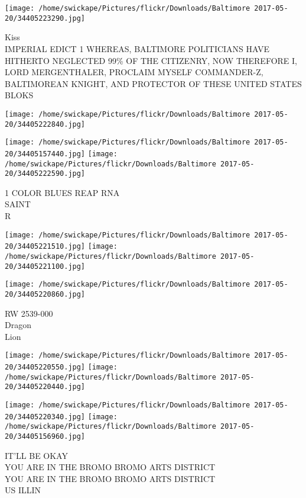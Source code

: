 \documentclass[10pt,letterpaper]{article}
\begin{document}
\vspace{0.25in}
\texttt{[image: /home/swickape/Pictures/flickr/Downloads/Baltimore 2017-05-20/34405223290.jpg]}

Kiss\\
IMPERIAL EDICT 1 WHEREAS, BALTIMORE POLITICIANS HAVE HITHERTO NEGLECTED 99\% OF THE CITIZENRY, NOW THEREFORE I, LORD MERGENTHALER, PROCLAIM MYSELF COMMANDER{-}Z, BALTIMOREAN KNIGHT, AND PROTECTOR OF THESE UNITED STATES\\
BLOKS
\pagebreak

\texttt{[image: /home/swickape/Pictures/flickr/Downloads/Baltimore 2017-05-20/34405222840.jpg]}

\vspace{0.25in}
\texttt{[image: /home/swickape/Pictures/flickr/Downloads/Baltimore 2017-05-20/34405157440.jpg]}
\texttt{[image: /home/swickape/Pictures/flickr/Downloads/Baltimore 2017-05-20/34405222590.jpg]}

1 COLOR BLUES REAP RNA\\
SAINT\\
R
\pagebreak

\texttt{[image: /home/swickape/Pictures/flickr/Downloads/Baltimore 2017-05-20/34405221510.jpg]}
\texttt{[image: /home/swickape/Pictures/flickr/Downloads/Baltimore 2017-05-20/34405221100.jpg]}

\vspace{0.25in}
\texttt{[image: /home/swickape/Pictures/flickr/Downloads/Baltimore 2017-05-20/34405220860.jpg]}

RW 2539{-}000\\
Dragon\\
Lion
\pagebreak

\texttt{[image: /home/swickape/Pictures/flickr/Downloads/Baltimore 2017-05-20/34405220550.jpg]}
\texttt{[image: /home/swickape/Pictures/flickr/Downloads/Baltimore 2017-05-20/34405220440.jpg]}

\texttt{[image: /home/swickape/Pictures/flickr/Downloads/Baltimore 2017-05-20/34405220340.jpg]}
\texttt{[image: /home/swickape/Pictures/flickr/Downloads/Baltimore 2017-05-20/34405156960.jpg]}

IT'LL BE OKAY\\
YOU ARE IN THE BROMO BROMO ARTS DISTRICT\\
YOU ARE IN THE BROMO BROMO ARTS DISTRICT\\
US ILLIN
\pagebreak
\end{document}
